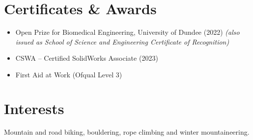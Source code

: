 \documentclass[a4paper,11pt]{article}
\begin{document}

\section*{Certificates \& Awards}
\begin{itemize}
    \item Open Prize for Biomedical Engineering, University of Dundee (2022) \textit{(also issued as School of Science and Engineering Certificate of Recognition)}
    \item CSWA – Certified SolidWorks Associate (2023)
    \item First Aid at Work (Ofqual Level 3)
\end{itemize}


\section*{Interests}
Mountain and road biking, bouldering, rope climbing and winter mountaineering.
\end{document}
